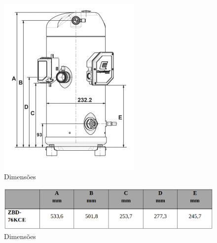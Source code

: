 \begin{itemize}
	\begin{figure}[!htbp] 
	 \centering
	  \includegraphics[scale=0.7]{editaveis/figuras/dimensao_compressor}
	  \caption[Dimensões]{Dimensões\footnotemark}
	  \label{grafico_opereting_envelope}
	\end{figure}	   
	\FloatBarrier
	\begin{figure}[!htbp]
	 \centering
	  \includegraphics[scale=0.4]{editaveis/figuras/dimensao_compressor_2}
	  \caption[Dimensão compressor]{Dimensões\footnotemark}
	  \label{grafico_opereting_envelope}
	\end{figure}	   
	\FloatBarrier
	\end{itemize}	